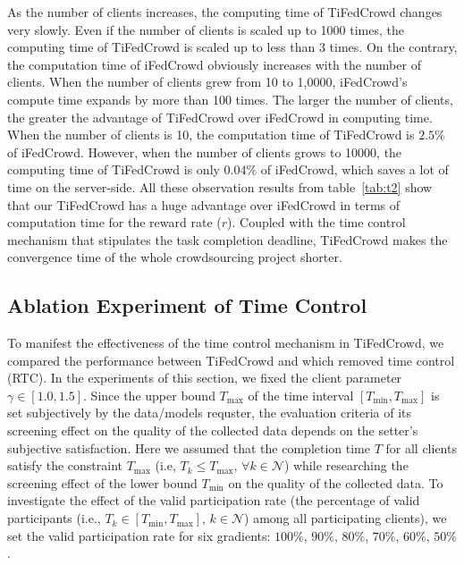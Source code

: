 \documentclass[final,1p,times]{elsarticle}
\begin{document}
As the number of clients increases, the computing time of TiFedCrowd changes very slowly. Even if the number of clients is scaled up to 1000 times, the computing time of TiFedCrowd is scaled up to less than 3 times. On the contrary, the computation time of iFedCrowd obviously increases with the number of clients. When the number of clients grew from 10 to 1,0000, iFedCrowd's compute time expands by more than 100 times. The larger the number of clients, the greater the advantage of TiFedCrowd over iFedCrowd in computing time. When the number of clients is 10, the computation time of TiFedCrowd is $2.5\%$ of iFedCrowd. However, when the number of clients grows to 10000, the computing time of TiFedCrowd is only $0.04\%$ of iFedCrowd, which saves a lot of time on the server-side. All these observation results from table~\ref{tab:t2} show that our TiFedCrowd has a huge advantage over iFedCrowd in terms of computation time for the reward rate ($r$). Coupled with the time control mechanism that stipulates the task completion deadline, TiFedCrowd makes the convergence time of the whole crowdsourcing project shorter.

\subsection{Ablation Experiment of Time Control}\label{RTTCM}
To manifest the effectiveness of the time control mechanism in TiFedCrowd, we compared the performance between TiFedCrowd and which removed time control (RTC). In the experiments of this section, we fixed the client parameter $\gamma\in[1.0,1.5]$. Since the upper bound $T_{\max}$ of the time interval $[T_{\min},T_{\max}]$ is set subjectively by the data/models requster, the evaluation criteria of its screening effect on the quality of the collected data depends on the setter's subjective satisfaction. Here we assumed that the completion time $T$ for all clients satisfy the constraint $T_{\max}$ (i.e, $T_k\le T_{\max},\,\forall k\in\bm{\mathcal{N}}$) while researching the screening effect of the lower bound $T_{\min}$ on the quality of the collected data. To investigate the effect of the valid participation rate (the percentage of valid participants (i.e., $T_k\in [T_{\min},T_{\max}],\, k\in\bm{\mathcal{N}}$) among all participating clients), we set the valid participation rate for six gradients: $100\%$, $90\%$, $80\%$, $70\%$, $60\%$, $50\%$. 
\end{document}
